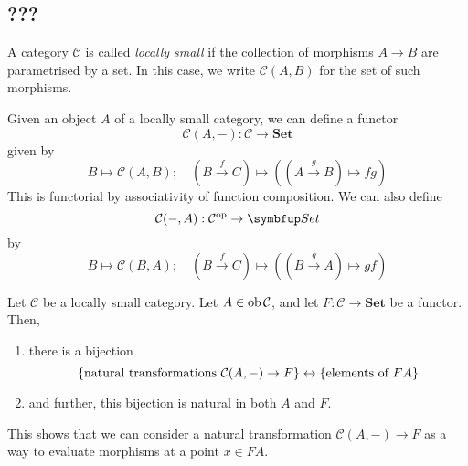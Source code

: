 \subsection{???}
\begin{definition}
    A category \( \mathcal C \) is called \emph{locally small} if the collection of morphisms \( A \to B \) are parametrised by a set.
    In this case, we write \( \mathcal C(A, B) \) for the set of such morphisms.
\end{definition}
Given an object \( A \) of a locally small category, we can define a functor
\[ \mathcal C(A, -) : \mathcal C \to \mathbf{Set} \]
given by
\[ B \mapsto \mathcal C(A, B);\quad (B \xrightarrow f C) \mapsto ((A \xrightarrow g B) \mapsto f g) \]
This is functorial by associativity of function composition.
We can also define
\[ \mathcal C(-, A) : \mathcal C^\cop \to \mathbf{Set} \]
by
\[ B \mapsto \mathcal C(B, A);\quad (B \xrightarrow f C) \mapsto ((B \xrightarrow g A) \mapsto g f) \]
\begin{lemma}
    Let \( \mathcal C \) be a locally small category.
    Let \( A \in \operatorname{ob} \mathcal C \), and let \( F : \mathcal C \to \mathbf{Set} \) be a functor.
    Then,
    \begin{enumerate}
        \item there is a bijection
        \[ \qty{\text{natural transformations } \mathcal C(A, -) \to F} \leftrightarrow \qty{\text{elements of } F A} \]
        \item and further, this bijection is natural in both \( A \) and \( F \).
    \end{enumerate}
\end{lemma}
This shows that we can consider a natural transformation \( \mathcal C(A, -) \to F \) as a way to evaluate morphisms at a point \( x \in F A \).
